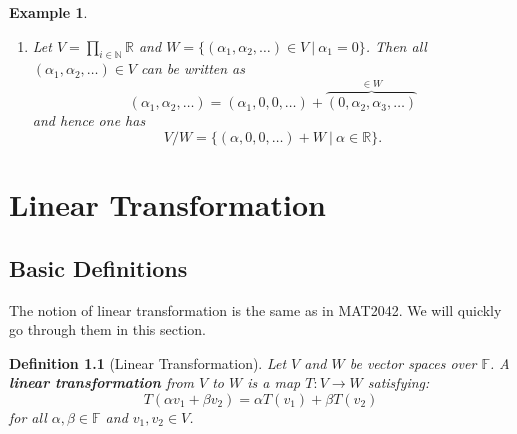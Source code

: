 \documentclass[12pt]{amsbook}
\newtheorem{definition}[theorem]{Definition}
\newtheorem{example}[theorem]{Example}
\begin{document}
\begin{example}
\begin{enumerate}
    \item Let $V = \prod_{i \in \mathbb{N}} \mathbb{R}$ and $W = \{(\alpha_1, \alpha_2, \dots) \in V \ |\ \alpha_1  = 0\}$. Then all $(\alpha_1, \alpha_2, \dots) \in V$ can be written as
    $$(\alpha_1, \alpha_2, \dots) = (\alpha_1, 0, 0, \dots) + \overbrace{(0,\alpha_2, \alpha_3, \dots)}^{\in W}$$
    and hence one has 
    $$V/W = \{(\alpha,0,0,\dots) + W\ |\ \alpha \in \mathbb{R}\}.$$
\end{enumerate}
\end{example}


\chapter{Linear Transformation}
\section{Basic Definitions}
The notion of linear transformation is the same as in MAT2042. We will quickly go through them in this section.
\begin{definition}[Linear Transformation]
    Let $V$ and $W$ be vector spaces over $\mathbb{F}$. A {\bf linear transformation} from $V$ to $W$ is a map $T:V \to W$ satisfying:
    $$T(\alpha v_1 + \beta v_2) = \alpha T(v_1) + \beta T(v_2)$$
    for all $\alpha, \beta \in \mathbb{F}$ and $v_1, v_2 \in V$.
\end{definition}
\end{document}
